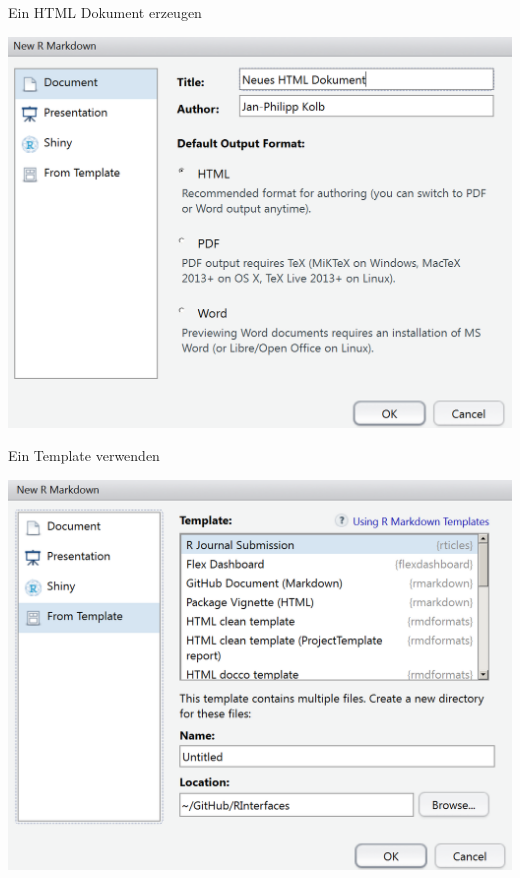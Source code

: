\documentclass[ignorenonframetext,]{beamer}
\begin{document}
\begin{frame}{Ein HTML Dokument erzeugen}

\includegraphics{./tex2pdf.956/31d4b4586dab4643e4d8b883abf882d5ff8fe3f6.png}

\end{frame}

\begin{frame}{Ein Template verwenden}

\includegraphics{./tex2pdf.956/1771b95da3be53fc31af968ebd1ed9e363cf9d6c.png}

\end{frame}
\end{document}
